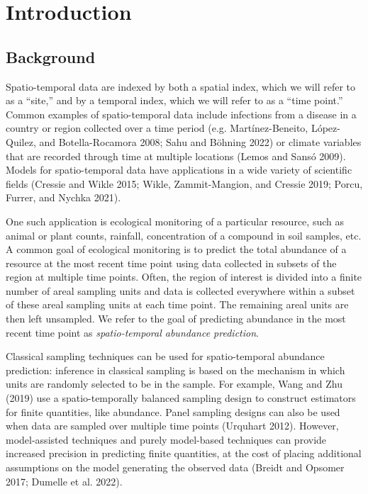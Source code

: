 \documentclass[smallextended]{svjour3}       %
\begin{document}
\hypertarget{intro}{%
\section{Introduction}\label{intro}}

\hypertarget{background}{%
\subsection{Background}\label{background}}

Spatio-temporal data are indexed by both a spatial index, which we will
refer to as a ``site,'' and by a temporal index, which we will refer to
as a ``time point.'' Common examples of spatio-temporal data include
infections from a disease in a country or region collected over a time
period (e.g. Martínez-Beneito, López-Quilez, and Botella-Rocamora 2008;
Sahu and Böhning 2022) or climate variables that are recorded through
time at multiple locations (Lemos and Sansó 2009). Models for
spatio-temporal data have applications in a wide variety of scientific
fields (Cressie and Wikle 2015; Wikle, Zammit-Mangion, and Cressie 2019;
Porcu, Furrer, and Nychka 2021).

One such application is ecological monitoring of a particular resource,
such as animal or plant counts, rainfall, concentration of a compound in
soil samples, etc. A common goal of ecological monitoring is to predict
the total abundance of a resource at the most recent time point using
data collected in subsets of the region at multiple time points. Often,
the region of interest is divided into a finite number of areal sampling
units and data is collected everywhere within a subset of these areal
sampling units at each time point. The remaining areal units are then
left unsampled. We refer to the goal of predicting abundance in the most
recent time point as \emph{spatio-temporal abundance prediction}.

Classical sampling techniques can be used for spatio-temporal abundance
prediction: inference in classical sampling is based on the mechanism in
which units are randomly selected to be in the sample. For example, Wang
and Zhu (2019) use a spatio-temporally balanced sampling design to
construct estimators for finite quantities, like abundance. Panel
sampling designs can also be used when data are sampled over multiple
time points (Urquhart 2012). However, model-assisted techniques and
purely model-based techniques can provide increased precision in
predicting finite quantities, at the cost of placing additional
assumptions on the model generating the observed data (Breidt and
Opsomer 2017; Dumelle et al. 2022).
\end{document}
